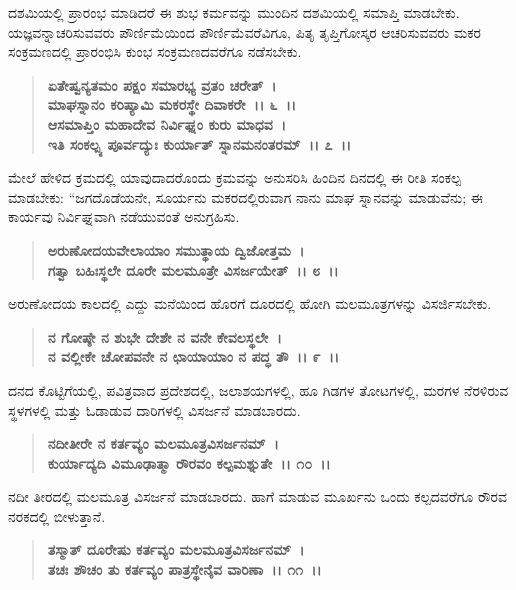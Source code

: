 ದಶಮಿಯಲ್ಲಿ ಪ್ರಾರಂಭ ಮಾಡಿದರೆ ಈ ಶುಭ ಕರ್ಮವನ್ನು ಮುಂದಿನ ದಶಮಿಯಲ್ಲಿ ಸಮಾಪ್ತಿ ಮಾಡಬೇಕು. ಯಜ್ಞವನ್ನಾಚರಿಸುವವರು ಪೌರ್ಣಿಮೆಯಿಂದ ಪೌರ್ಣಿಮೆವರೆವಿಗೂ, ಪಿತೃ ತೃಪ್ತಿಗೋಸ್ಕರ ಆಚರಿಸುವವರು ಮಕರ ಸಂಕ್ರಮಣದಲ್ಲಿ ಪ್ರಾರಂಭಿಸಿ ಕುಂಭ ಸಂಕ್ರಮಣದವರೆಗೂ ನಡೆಸಬೇಕು.

\begin{verse}
\textbf{ಏತೇಷ್ವನ್ಯತಮಂ ಪಕ್ಷಂ ಸಮಾರಭ್ಯ ವ್ರತಂ ಚರೇತ್~।}\\\textbf{ಮಾಘಸ್ನಾನಂ ಕರಿಷ್ಯಾಮಿ ಮಕರಸ್ಥೇ ದಿವಾಕರೇ~।। ೬~।।}\\\textbf{ಆಸಮಾಪ್ತಿಂ ಮಹಾದೇವ ನಿರ್ವಿಘ್ನಂ ಕುರು ಮಾಧವ~।}\\\textbf{ಇತಿ ಸಂಕಲ್ಪ್ಯ ಪೂರ್ವದ್ಯುಃ ಕುರ್ಯಾತ್ ಸ್ನಾನಮನಂತರಮ್~।। ೭~।।}
\end{verse}

ಮೇಲೆ ಹೇಳಿದ ಕ್ರಮದಲ್ಲಿ ಯಾವುದಾದರೊಂದು ಕ್ರಮವನ್ನು ಅನುಸರಿಸಿ ಹಿಂದಿನ ದಿನದಲ್ಲಿ ಈ ರೀತಿ ಸಂಕಲ್ಪ ಮಾಡಬೇಕು: ``ಜಗದೊಡೆಯನೇ, ಸೂರ್ಯನು ಮಕರದಲ್ಲಿರುವಾಗ ನಾನು ಮಾಘ ಸ್ನಾನವನ್ನು ಮಾಡುವೆನು; ಈ ಕಾರ್ಯವು ನಿರ್ವಿಘ್ನವಾಗಿ ನಡೆಯುವಂತೆ ಅನುಗ್ರಹಿಸು.

\begin{verse}
\textbf{ಅರುಣೋದಯವೇಲಾಯಾಂ ಸಮುತ್ಥಾಯ ದ್ವಿಜೋತ್ತಮ~।}\\\textbf{ಗತ್ವಾ ಬಹಿಃಸ್ಥಲೇ ದೂರೇ ಮಲಮೂತ್ರೇ ವಿಸರ್ಜಯೇತ್~।। ೮~।।}
\end{verse}

ಅರುಣೋದಯ ಕಾಲದಲ್ಲಿ ಎದ್ದು ಮನೆಯಿಂದ ಹೊರಗೆ ದೂರದಲ್ಲಿ ಹೋಗಿ ಮಲಮೂತ್ರಗಳನ್ನು ವಿಸರ್ಜಿಸಬೇಕು.

\begin{verse}
\textbf{ನ ಗೋಷ್ಠೇ ನ ಶುಭೇ ದೇಶೇ ನ ವನೇ ಕೇವಲಸ್ಥಲೇ~।}\\\textbf{ನ ವಲ್ಲೀಕೇ ಚೋಪವನೇ ನ ಛಾಯಾಯಾಂ ನ ಪದ್ಧ ತೌ~।। ೯~।।}
\end{verse}

ದನದ ಕೊಟ್ಟಿಗೆಯಲ್ಲಿ, ಪವಿತ್ರವಾದ ಪ್ರದೇಶದಲ್ಲಿ, ಜಲಾಶಯಗಳಲ್ಲಿ, ಹೂ ಗಿಡಗಳ ತೋಟಗಳಲ್ಲಿ, ಮರಗಳ ನೆರಳಿರುವ ಸ್ಥಳಗಳಲ್ಲಿ ಮತ್ತು ಓಡಾಡುವ ದಾರಿಗಳಲ್ಲಿ ವಿಸರ್ಜನೆ ಮಾಡಬಾರದು.

\begin{verse}
\textbf{ನದೀತೀರೇ ನ ಕರ್ತವ್ಯಂ ಮಲಮೂತ್ರವಿಸರ್ಜನಮ್~।}\\\textbf{ಕುರ್ಯಾದ್ಯದಿ ವಿಮೂಢಾತ್ಮಾ ರೌರವಂ ಕಲ್ಪಮಶ್ನುತೇ~।। ೧೦~।।}
\end{verse}

ನದೀ ತೀರದಲ್ಲಿ ಮಲಮೂತ್ರ ವಿಸರ್ಜನೆ ಮಾಡಬಾರದು. ಹಾಗೆ ಮಾಡುವ ಮೂರ್ಖನು ಒಂದು ಕಲ್ಪದವರೆಗೂ ರೌರವ ನರಕದಲ್ಲಿ ಬೀಳುತ್ತಾನೆ.

\begin{verse}
\textbf{ತಸ್ಮಾತ್ ದೂರೇಷು ಕರ್ತವ್ಯಂ ಮಲಮೂತ್ರವಿಸರ್ಜನಮ್~।}\\\textbf{ತಚಃ ಶೌಚಂ ತು ಕರ್ತವ್ಯಂ ಪಾತ್ರಸ್ಥೇನೈವ ವಾರಿಣಾ~।। ೧೧~।।}
\end{verse}

